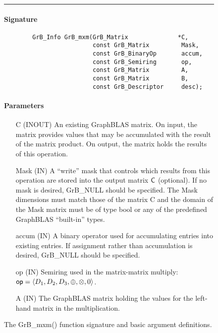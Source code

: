 \begin{figure*}[h]
\hrule
	\caption{The {\sf GrB\_mxm()} function signature and basic argument definitions.}
\label{Fig:mxm}
\paragraph{Signature}
\footnotesize
\begin{verbatim}
        GrB_Info GrB_mxm(GrB_Matrix              *C,
                         const GrB_Matrix         Mask,
                         const GrB_BinaryOp       accum,
                         const GrB_Semiring       op,
                         const GrB_Matrix         A, 
                         const GrB_Matrix         B,
                         const GrB_Descriptor     desc);
\end{verbatim}

\paragraph{Parameters}

\begin{itemize}[leftmargin=1.1in]
    \item[{\sf C}]    ({\sf INOUT}) An existing GraphBLAS matrix. On
    input, the matrix provides values that may be accumulated with the
    result of the matrix product.   On output, the matrix holds the
    results of this operation.

    \item[{\sf Mask}] ({\sf IN}) A ``write'' mask that controls which
    results from this operation are stored into the output matrix
    ${\sf C}$ (optional).  If no mask is desired,  {\sf GrB\_NULL}
    should be specified. The Mask dimensions must match those of the
    matrix {\sf C} and the domain of the {\sf Mask} matrix must be
    of type {\sf bool} or any of the predefined GraphBLAS ``built-in'' types.

    \item[{\sf accum}] ({\sf IN}) A binary operator used for accumulating entries
    into existing  entries. If assignment rather than accumulation is
    desired, {\sf GrB\_NULL} should be specified.

    \item[{\sf op}] ({\sf IN}) Semiring used in the matrix-matrix
    multiply: ${\sf op}=\langle D_1,D_2,D_3,\oplus,\otimes,0 \rangle$.

    \item[{\sf A}] ({\sf IN}) The GraphBLAS matrix holding the values
    for the left-hand matrix in the multiplication.


\end{itemize}
\end{figure*}
